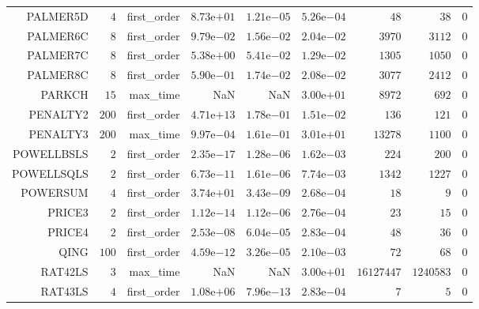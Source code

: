 \begin{longtable}{rrrrrrrrr}
PALMER5D & \(     4\) & first\_order & \( 8.73\)e\(+01\) & \( 1.21\)e\(-05\) & \( 5.26\)e\(-04\) & \(    48\) & \(    38\) & \(     0\) \\
PALMER6C & \(     8\) & first\_order & \( 9.79\)e\(-02\) & \( 1.56\)e\(-02\) & \( 2.04\)e\(-02\) & \(  3970\) & \(  3112\) & \(     0\) \\
PALMER7C & \(     8\) & first\_order & \( 5.38\)e\(+00\) & \( 5.41\)e\(-02\) & \( 1.29\)e\(-02\) & \(  1305\) & \(  1050\) & \(     0\) \\
PALMER8C & \(     8\) & first\_order & \( 5.90\)e\(-01\) & \( 1.74\)e\(-02\) & \( 2.08\)e\(-02\) & \(  3077\) & \(  2412\) & \(     0\) \\
PARKCH & \(    15\) & max\_time &       NaN &       NaN & \( 3.00\)e\(+01\) & \(  8972\) & \(   692\) & \(     0\) \\
PENALTY2 & \(   200\) & first\_order & \( 4.71\)e\(+13\) & \( 1.78\)e\(-01\) & \( 1.51\)e\(-02\) & \(   136\) & \(   121\) & \(     0\) \\
PENALTY3 & \(   200\) & max\_time & \( 9.97\)e\(-04\) & \( 1.61\)e\(-01\) & \( 3.01\)e\(+01\) & \( 13278\) & \(  1100\) & \(     0\) \\
POWELLBSLS & \(     2\) & first\_order & \( 2.35\)e\(-17\) & \( 1.28\)e\(-06\) & \( 1.62\)e\(-03\) & \(   224\) & \(   200\) & \(     0\) \\
POWELLSQLS & \(     2\) & first\_order & \( 6.73\)e\(-11\) & \( 1.61\)e\(-06\) & \( 7.74\)e\(-03\) & \(  1342\) & \(  1227\) & \(     0\) \\
POWERSUM & \(     4\) & first\_order & \( 3.74\)e\(+01\) & \( 3.43\)e\(-09\) & \( 2.68\)e\(-04\) & \(    18\) & \(     9\) & \(     0\) \\
PRICE3 & \(     2\) & first\_order & \( 1.12\)e\(-14\) & \( 1.12\)e\(-06\) & \( 2.76\)e\(-04\) & \(    23\) & \(    15\) & \(     0\) \\
PRICE4 & \(     2\) & first\_order & \( 2.53\)e\(-08\) & \( 6.04\)e\(-05\) & \( 2.83\)e\(-04\) & \(    48\) & \(    36\) & \(     0\) \\
QING & \(   100\) & first\_order & \( 4.59\)e\(-12\) & \( 3.26\)e\(-05\) & \( 2.10\)e\(-03\) & \(    72\) & \(    68\) & \(     0\) \\
RAT42LS & \(     3\) & max\_time &       NaN &       NaN & \( 3.00\)e\(+01\) & \(16127447\) & \(1240583\) & \(     0\) \\
RAT43LS & \(     4\) & first\_order & \( 1.08\)e\(+06\) & \( 7.96\)e\(-13\) & \( 2.83\)e\(-04\) & \(     7\) & \(     5\) & \(     0\) \\

\end{longtable}
